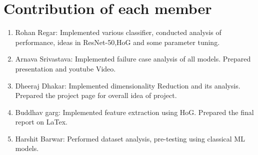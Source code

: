 \documentclass[a4paper]{article}
\theoremstyle{plain}
\theoremstyle{definition}
\begin{document}
	\appendix
	
	\section{Contribution of each member}
	\label{sec:contribution}
	\begin{enumerate}
	\item Rohan Regar: Implemented various classifier, conducted        analysis of performance, ideas in ResNet-50,HoG and some            parameter tuning. 
        \item Arnava Srivastava: Implemented failure case analysis of all models. Prepared presentation and youtube Video.
        \item Dheeraj Dhakar: Implemented dimensionality Reduction and its analysis. Prepared the project page for overall idea of project.
	\item Buddhav garg: Implemented feature extraction using HoG. Prepared the final report on LaTex.
	\item Harshit Barwar: Performed dataset analysis, pre-testing using classical ML models.
	\end{enumerate}
    	
	
\end{document}
